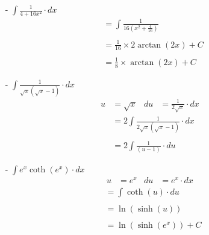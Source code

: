 \documentclass{report}
\begin{document}
  \newpage

  \begin{itemize}
    \item[-] $\displaystyle{\int \frac{1}{4 + 16x^2} \cdot dx}$
      \begin{align*}
        & = \int \frac{1}{16 (x^2 + \frac{4}{16})} \\ \\
        & = \frac{1}{16} \times 2 \arctan(2x) + C \\ \\
        & = \frac{1}{8} \times \arctan(2x) + C
      \end{align*}
  \end{itemize}

  \newpage

  \begin{itemize}
    \item[-] $\displaystyle{\int \frac{1}{\sqrt{x}(\sqrt{x} - 1)} \cdot dx}$
      \begin{align*}
        u & = \sqrt{x} & du & = \frac{1}{2 \sqrt{x}} \cdot dx
      \end{align*}
      \begin{align*}
        & = 2 \int \frac{1}{2 \sqrt{x}(\sqrt{x} - 1)} \cdot dx \\ \\
        & = 2 \int \frac{1}{(u - 1)} \cdot du
      \end{align*}
  \end{itemize}

  \newpage

  \begin{itemize}
    \item[-] $\displaystyle{\int e^x \coth(e^x) \cdot dx}$
      \begin{align*}
        u & = e^x & du & = e^x \cdot dx
      \end{align*}
      \begin{align*}
        & = \int \coth(u) \cdot du \\ \\
        & = \ln(\sinh(u)) \\ \\
        & = \ln(\sinh(e^x)) + C
      \end{align*}
  \end{itemize}

  \newpage
\end{document}
